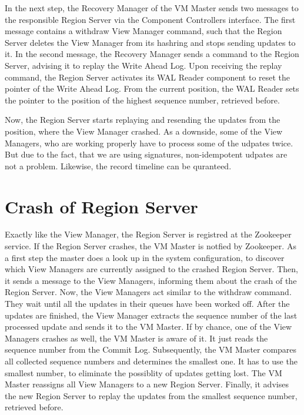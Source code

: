 \documentclass[11pt,a4paper,bibtotoc,idxtotoc,headsepline,footsepline,footexclude,BCOR12mm,DIV13]{scrbook}
\begin{document}
In the next step, the Recovery Manager of the VM Master sends two messages to the responsible Region Server via the Component Controllers interface. The first message contains a withdraw View Manager command, such that the Region Server deletes the View Manager from its hashring and stops sending updates to it. In the second message, the Recovery Manager sends a command to the Region Server, advising it to replay the Write Ahead Log. Upon receiving the replay command, the Region Server activates its WAL Reader component to reset the pointer of the Write Ahead Log. From the current position, the WAL Reader sets the pointer to the position of the highest sequence number, retrieved before.

Now, the Region Server starts replaying and resending the updates from the position, where the View Manager crashed. As a downside, some of the View Managers, who are working properly have to process some of the udpates twice. But due to the fact, that we are using signatures, non-idempotent udpates are not a problem. Likewise, the record timeline can be quranteed.



\section{Crash of Region Server}
Exactly like the View Manager, the Region Server is registred at the Zookeeper service. If the Region Server crashes, the VM Master is notfied by Zookeeper. As a first step the master does a look up in the system configuration, to discover which View Managers are currently assigned to the crashed Region Server.  Then, it sends a message to the View Managers, informing them about the crash of the Region Server. Now, the View Managers act similar to the withdraw command. They wait until all the updates in their queues have been worked off. After the updates are finished, the View Manager extracts the sequence number of the last processed update and sends it to the VM Master. If by chance, one of the View Managers crashes as well, the VM Master is aware of it. It just reads the sequence number from the Commit Log. Subsequently, the VM Master compares all collected sequence numbers and determines the smallest one. It has to use the smallest number, to eliminate the possiblity of updates getting lost. The VM Master reassigns all View Managers to a new Region Server. Finally, it advises the new Region Server to replay the updates from the smallest sequence number, retrieved before.
\end{document}
